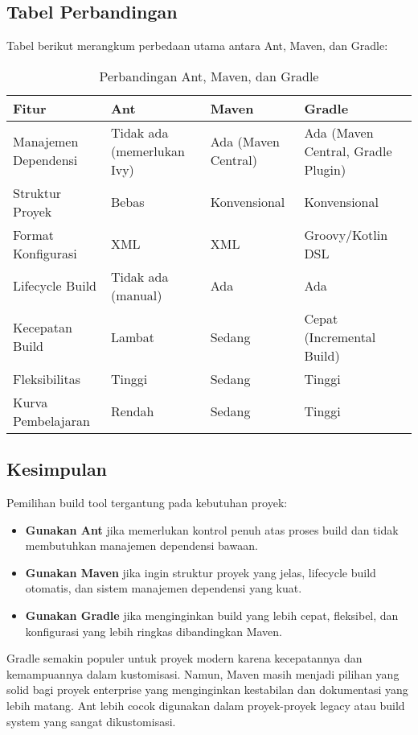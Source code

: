 \subsection{Tabel Perbandingan}
Tabel berikut merangkum perbedaan utama antara Ant, Maven, dan Gradle:

\begin{table}[h]
	\centering
	\scriptsize
	\begin{tabular}{|p{}|p{}|p{}|p{}|}
		\hline
		\textbf{Fitur} & \textbf{Ant} & \textbf{Maven} & \textbf{Gradle} \\
		\hline
		Manajemen Dependensi & Tidak ada (memerlukan Ivy) & Ada (Maven Central) & Ada (Maven Central, Gradle Plugin) \\
		\hline
		Struktur Proyek & Bebas & Konvensional & Konvensional \\
		\hline
		Format Konfigurasi & XML & XML & Groovy/Kotlin DSL \\
		\hline
		Lifecycle Build & Tidak ada (manual) & Ada & Ada \\
		\hline
		Kecepatan Build & Lambat & Sedang & Cepat (Incremental Build) \\
		\hline
		Fleksibilitas & Tinggi & Sedang & Tinggi \\
		\hline
		Kurva Pembelajaran & Rendah & Sedang & Tinggi \\
		\hline
	\end{tabular}
	\caption{Perbandingan Ant, Maven, dan Gradle}
	\label{tab:comparison}
\end{table}

\subsection{Kesimpulan}
Pemilihan build tool tergantung pada kebutuhan proyek:
\begin{itemize}
	\item \textbf{Gunakan Ant} jika memerlukan kontrol penuh atas proses build dan tidak membutuhkan manajemen dependensi bawaan.
	\item \textbf{Gunakan Maven} jika ingin struktur proyek yang jelas, lifecycle build otomatis, dan sistem manajemen dependensi yang kuat.
	\item \textbf{Gunakan Gradle} jika menginginkan build yang lebih cepat, fleksibel, dan konfigurasi yang lebih ringkas dibandingkan Maven.
\end{itemize}

Gradle semakin populer untuk proyek modern karena kecepatannya dan kemampuannya dalam kustomisasi. Namun, Maven masih menjadi pilihan yang solid bagi proyek enterprise yang menginginkan kestabilan dan dokumentasi yang lebih matang. Ant lebih cocok digunakan dalam proyek-proyek legacy atau build system yang sangat dikustomisasi.




